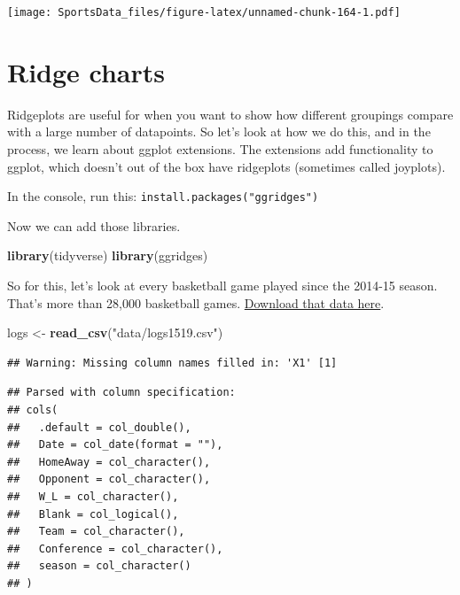 \documentclass[
]{book}
\newenvironment{Shaded}{\begin{snugshade}}{\end{snugshade}}
\newcommand{\KeywordTok}[1]{\textcolor[rgb]{0.13,0.29,0.53}{\textbf{#1}}}
\newcommand{\NormalTok}[1]{#1}
\newcommand{\StringTok}[1]{\textcolor[rgb]{0.31,0.60,0.02}{#1}}
\begin{document}
\texttt{[image: SportsData\_files/figure-latex/unnamed-chunk-164-1.pdf]}

\hypertarget{ridge-charts}{%
\chapter{Ridge charts}\label{ridge-charts}}

Ridgeplots are useful for when you want to show how different groupings compare with a large number of datapoints. So let's look at how we do this, and in the process, we learn about ggplot extensions. The extensions add functionality to ggplot, which doesn't out of the box have ridgeplots (sometimes called joyplots).

In the console, run this: \texttt{install.packages("ggridges")}

Now we can add those libraries.

\begin{Shaded}
\begin{Highlighting}[]
\KeywordTok{library}\NormalTok{(tidyverse)}
\KeywordTok{library}\NormalTok{(ggridges)}
\end{Highlighting}
\end{Shaded}

So for this, let's look at every basketball game played since the 2014-15 season. That's more than 28,000 basketball games. \href{https://unl.box.com/s/u9407jj007fxtnu1vbkybdawaqg6j3fw}{Download that data here}.

\begin{Shaded}
\begin{Highlighting}[]
\NormalTok{logs <-}\StringTok{ }\KeywordTok{read_csv}\NormalTok{(}\StringTok{"data/logs1519.csv"}\NormalTok{)}
\end{Highlighting}
\end{Shaded}

\begin{verbatim}
## Warning: Missing column names filled in: 'X1' [1]
\end{verbatim}

\begin{verbatim}
## Parsed with column specification:
## cols(
##   .default = col_double(),
##   Date = col_date(format = ""),
##   HomeAway = col_character(),
##   Opponent = col_character(),
##   W_L = col_character(),
##   Blank = col_logical(),
##   Team = col_character(),
##   Conference = col_character(),
##   season = col_character()
## )
\end{verbatim}
\end{document}
